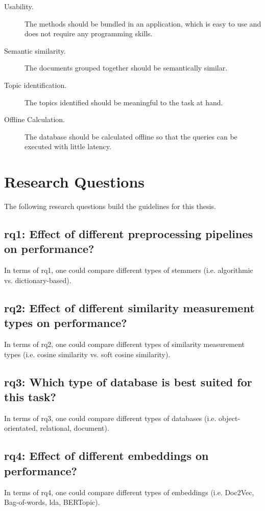 \begin{description}
    \item[Usability.]
    The methods should be bundled in an application, which is easy to use and does not require any programming skills.
    \item[Semantic similarity.]
    The documents grouped together should be semantically similar.
    \item[Topic identification.]
    The topics identified should be meaningful to the task at hand.  
    \item[Offline Calculation.]
    The database should be calculated offline so that the queries can be executed with little latency.
\end{description}


\section{Research Questions}\label{sec:research-questions}
The following research questions build the guidelines for this thesis.

\subsection[\acs{rq}1]{\ac{rq}1: Effect of different preprocessing pipelines on performance?}\label{subsec:rq1}
In terms of \ac{rq}1, one could compare different types of stemmers (i.e. algorithmic vs. dictionary-based).

\subsection[\acs{rq}2]{\ac{rq}2: Effect of different similarity measurement types on performance?}\label{subsec:rq2}
In terms of \ac{rq}2, one could compare different types of similarity measurement types (i.e. cosine similarity vs. soft cosine similarity).

\subsection[\acs{rq}3]{\ac{rq}3: Which type of database is best suited for this task?}\label{subsec:rq3}
In terms of \ac{rq}3, one could compare different types of databases (i.e. object-orientated, relational, document).

\subsection[\acs{rq}4]{\ac{rq}4: Effect of different embeddings on performance?}\label{subsec:rq4}
In terms of \ac{rq}4, one could compare different types of embeddings (i.e. Doc2Vec, Bag-of-words, \ac{lda}, BERTopic).



